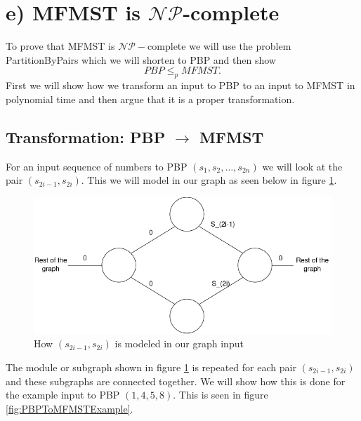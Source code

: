 \section*{e) MFMST is $\mathcal{NP}$-complete}
To prove that MFMST is $\mathcal{NP}-$complete we will use the problem PartitionByPairs which we will shorten to PBP and then show
\[
    PBP\leq_p MFMST.
\]
First we will show how we transform an input to PBP to an input to MFMST in polynomial time and then argue that it is a proper transformation.

\subsection*{Transformation: PBP $\rightarrow$ MFMST}
For an input sequence of numbers to PBP $(s_1,s_2,\dots, s_{2n})$ we will look at the pair $(s_{2i-1},s_{2i})$. This we will model in our graph as seen below in figure \ref{fig:PBPToMFMST}.

\begin{figure}[h]
    \centering
    \includegraphics[width=0.6\linewidth]{Latex/Billeder/PBPToMFMST.png}
    \caption{How $(s_{2i-1},s_{2i})$ is modeled in our graph input}
    \label{fig:PBPToMFMST}
\end{figure}

The module or subgraph shown in figure \ref{fig:PBPToMFMST} is repeated for each pair $(s_{2i-1},s_{2i})$ and these subgraphs are connected together. We will show how this is done for the example input to PBP $(1,4,5,8)$. This is seen in figure \ref{fig:PBPToMFMSTExample}. 

